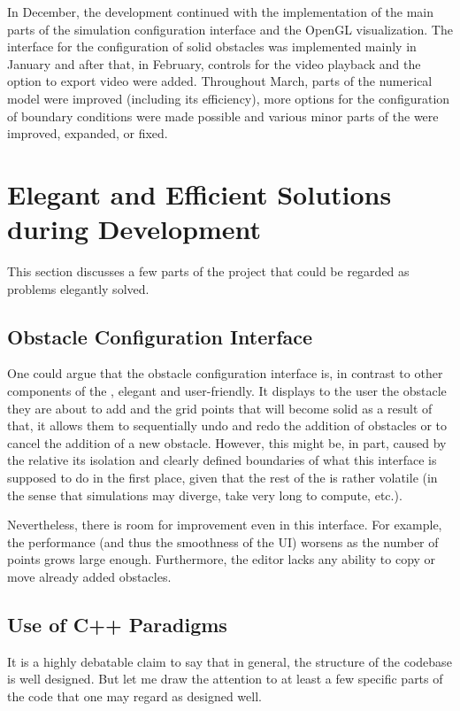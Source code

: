 \documentclass[11pt,a4paper,twoside,openright]{report}
\begin{document}
In December, the development continued with the implementation of the main parts of the simulation configuration interface and the OpenGL visualization. The interface for the configuration of solid obstacles was implemented mainly in January and after that, in February, controls for the video playback and the option to export video were added. Throughout March, parts of the numerical model were improved (including its efficiency), more options for the configuration of boundary conditions were made possible and various minor parts of the \software{} were improved, expanded, or fixed.

\section{Elegant and Efficient Solutions during Development}
This section discusses a few parts of the project that could be regarded as problems elegantly solved.

\subsection{Obstacle Configuration Interface}
One could argue that the obstacle configuration interface is, in contrast to other components of the \software{}, elegant and user-friendly. It displays to the user the obstacle they are about to add and the grid points that will become solid as a result of that, it allows them to sequentially undo and redo the addition of obstacles or to cancel the addition of a new obstacle. However, this might be, in part, caused by the relative its isolation and clearly defined boundaries of what this interface is supposed to do in the first place, given that the rest of the \software{} is rather volatile (in the sense that simulations may diverge, take very long to compute, etc.).

Nevertheless, there is room for improvement even in this interface. For example, the performance (and thus the smoothness of the UI) worsens as the number of points grows large enough. Furthermore, the editor lacks any ability to copy or move already added obstacles.

\subsection{Use of C++ Paradigms}
It is a highly debatable claim to say that in general, the structure of the codebase is well designed. But let me draw the attention to at least a few specific parts of the code that one may regard as designed well.
\end{document}
